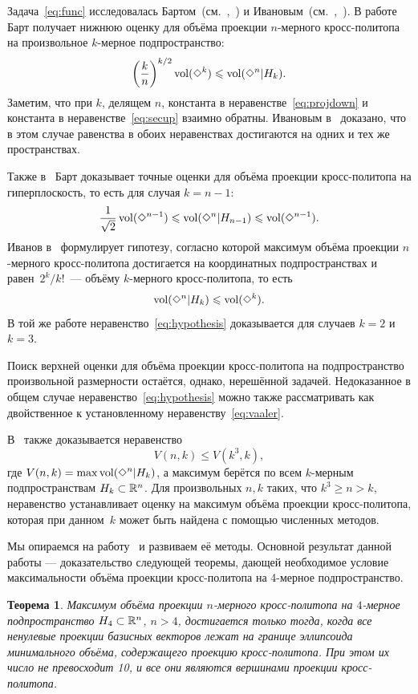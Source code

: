\documentclass[a4paper,12pt]{article}
\def\vol{\mathop{\rm vol}}
\newcommand{\crosp}{\Diamond}
\newtheorem{theorem}{Теорема}[section]
\numberwithin{equation}{section}
\begin{document}
	Задача~\eqref{eq:func} исследовалась Бартом~(см.~\cite{barthe},~\cite{hyperbarthe}) и Ивановым~(см.~\cite{crospol},~\cite{ellips}). В работе~\cite{barthe} Барт получает нижнюю оценку для объёма проекции $n$-мерного кросс-политопа на произвольное $k$-мерное подпространство:
		\begin{equation}\label{eq:projdown}
			\left(\frac{k}{n}\right)^{k/2}\vol(\crosp^k)\leqslant\vol(\crosp^n|H_k).
		\end{equation}
	Заметим, что при $k$, делящем $n$, константа в неравенстве~\eqref{eq:projdown} и константа в неравенстве~\eqref{eq:secup} взаимно обратны. Ивановым в~\cite{ellips} доказано, что в этом случае равенства в обоих неравенствах достигаются на одних и тех же пространствах.

	Также в~\cite{hyperbarthe} Барт доказывает точные оценки для объёма проекции кросс-политопа на гиперплоскость, то есть для случая $k=n-1$:
		\begin{equation}
			\frac{1}{\sqrt2}\vol(\crosp^{n-1})\leqslant\vol(\crosp^n|H_{n-1})\leqslant\vol(\crosp^{n-1}).	
		\end{equation}
	Иванов в~\cite{crospol} формулирует гипотезу, согласно которой максимум объёма проекции $n$-мерного кросс-политопа достигается на координатных подпространствах и равен~$2^k/k!$~--- объёму $k$-мерного кросс-политопа, то есть
		\begin{equation}\label{eq:hypothesis}
			\vol(\crosp^n|H_k)\leqslant\vol(\crosp^k).
		\end{equation}
	В той же работе неравенство~\eqref{eq:hypothesis} доказывается для случаев $k=2$ и $k=3$.

	Поиск верхней оценки для объёма проекции кросс-политопа на подпространство произвольной размерности остаётся, однако, нерешённой задачей. Недоказанное в общем случае неравенство~\eqref{eq:hypothesis} можно также рассматривать как двойственное к установленному неравенству~\eqref{eq:vaaler}.

	В~\cite{crospol} также доказывается неравенство
		$$V(n,k)\leqslant V(k^3,k),$$
	где $V(n,k)=\displaystyle\max\vol(\crosp^n|H_k)$, а максимум берётся по всем $k$-мерным подпространствам $H_k\subset\mathbb {R}^n$. Для произвольных $n,k$ таких, что $k^3\geqslant n>k$, неравенство устанавливает оценку на максимум объёма проекции кросс-политопа, которая при данном~$k$ может быть найдена с помощью численных методов.

	Мы опираемся на работу~\cite{crospol} и развиваем её методы. Основной результат данной работы --- доказательство следующей теоремы, дающей необходимое условие максимальности объёма проекции кросс-политопа на 4-мерное подпространство.
		\begin{theorem}\label{theorem:main}
			Максимум объёма проекции $n$-мерного кросс-политопа на $4$-мерное подпространство $H_4\subset\mathbb {R}^n$, $n>4$, достигается только тогда, когда все ненулевые проекции базисных векторов лежат на границе эллипсоида минимального объёма, содержащего проекцию кросс-политопа. При этом их число не превосходит 10, и все они являются вершинами проекции кросс-политопа.
		\end{theorem}
\end{document}
